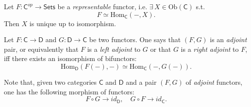 \begin{prop}
	Let $F\colon \mathsf{C}^{op} \to \mathsf{Sets}$ be a {\em representable} functor, i.e. $\exists\, X \in \mathrm{Ob} \left(\mathsf{C}\right)$ s.t.
	\begin{equation}
	F \simeq \mathrm{Hom}_{\mathsf{C}} \left( -, X \right)
	.\end{equation} 
	Then $X$ is unique up to isomorphism.
\end{prop} 

\begin{defn}
	Let $F\colon \mathsf{C} \to \mathsf{D}$ and $G\colon \mathsf{D} \to \mathsf{C}$ be two functors.
	One says that $\left(F, G\right)$ is an {\em adjoint} pair, or equivalently that $F$ is a {\em left adjoint} to $G$ or that $G$ is a {\em right adjoint} to $F$,
	iff there exists an isomorphism of bifunctors:
	\begin{equation}
		\mathrm{Hom}_{\mathsf{D}} \left( F(-), - \right) \simeq
		\mathrm{Hom}_{\mathsf{C}} \left( -, G(-) \right)
	.\end{equation} 
\end{defn}

\begin{rem}
	Note that, given two categories $\mathsf{C}$ and $\mathsf{D}$ and a pair $\left(F, G\right)$ of {\em adjoint} functors, one has the following morphism of functors:
	\begin{equation}
	F \circ G \to id_\mathsf{D}, \quad G \circ F \to id_\mathsf{C}
	.\end{equation} 
\end{rem}
